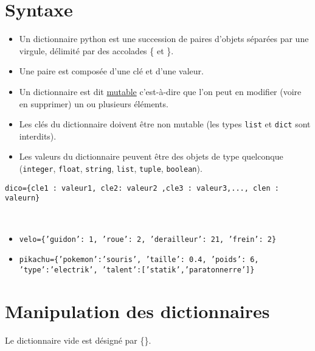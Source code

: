 \section{Syntaxe}

\begin{itemize}
\item Un dictionnaire python est une succession de paires d'objets séparées par une virgule, délimité par des accolades \{ et \}.
\item Une paire est composée d'une clé et d'une valeur.%
\item Un dictionnaire est dit \underline{mutable} c'est-à-dire que l'on peut en modifier (voire en supprimer) un ou plusieurs éléments.
\item Les clés du dictionnaire doivent être non mutable (les types \texttt{list} et \texttt{dict} sont interdits).
\item Les valeurs du dictionnaire peuvent être des objets de type quelconque (\texttt{integer}, \texttt{float}, \texttt{string}, \texttt{list}, \texttt{tuple}, \texttt{boolean}).
\end{itemize}

\begin{center}
\texttt{dico=\{cle1 : valeur1, cle2: valeur2  ,cle3 : valeur3,..., clen : valeurn\}\\}
\end{center}

\begin{exemple}~\\

\begin{itemize}
\item \texttt{velo=\{'guidon': 1, 'roue': 2, 'derailleur': 21, 'frein': 2\}}
\item \texttt{pikachu=\{'pokemon':'souris', 'taille': 0.4, 'poids': 6, 'type':'electrik', 'talent':['statik','paratonnerre']\}}
\end{itemize}
\end{exemple}

\section{Manipulation des dictionnaires}
Le dictionnaire vide est désigné par \{\}.
